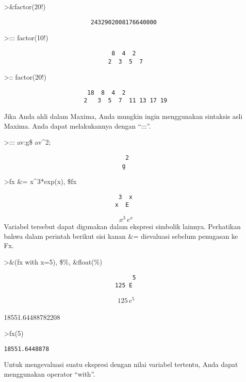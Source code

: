 \documentclass[
]{book}
\begin{document}
\textgreater\&factor(20!)

\begin{verbatim}
                         2432902008176640000
\end{verbatim}

\textgreater::: factor(10!)

\begin{verbatim}
                               8  4  2
                              2  3  5  7
\end{verbatim}

\textgreater:: factor(20!)

\begin{verbatim}
                        18  8  4  2
                       2   3  5  7  11 13 17 19
\end{verbatim}

Jika Anda ahli dalam Maxima, Anda mungkin ingin menggunakan sintaksis asli Maxima. Anda dapat melakukannya dengan ``:::''.

\textgreater::: av:g\$ av\^{}2;

\begin{verbatim}
                                   2
                                  g
\end{verbatim}

\textgreater fx \&= x\^{}3*exp(x), \$fx

\begin{verbatim}
                                 3  x
                                x  E
\end{verbatim}

\[x^3\,e^{x}\]Variabel tersebut dapat digunakan dalam ekspresi simbolik lainnya. Perhatikan bahwa dalam perintah berikut sisi kanan \&= dievaluasi sebelum penugasan ke Fx.

\textgreater\&(fx with x=5), \$\%, \&float(\%)

\begin{verbatim}
                                     5
                                125 E
\end{verbatim}

\[125\,e^5\]\\
18551.64488782208

\textgreater fx(5)

\begin{verbatim}
18551.6448878
\end{verbatim}

Untuk mengevaluasi suatu ekspresi dengan nilai variabel tertentu, Anda dapat menggunakan operator ``with''.
\end{document}
